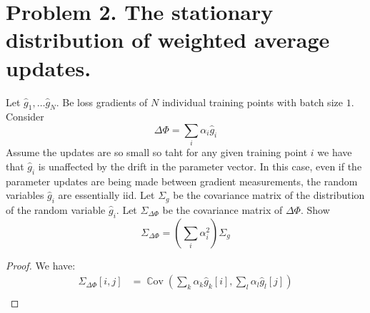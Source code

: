 \documentclass{amsart}
\newcommand{\Cov}[1]{\operatorname{\mathbb{C}ov}\left(#1\right)}
\theoremstyle{definition}
\begin{document}
\section*{Problem 2. The stationary distribution of weighted average updates. }
Let $\hat{g}_1, \ldots \hat{g}_N$. Be loss gradients of $N$ individual training points with batch size $1$. 
Consider 
\[
\Delta \Phi = \sum_{i} \alpha_i \hat{g}_i
\]
Assume the updates are so small so taht for any given training point $i$ we have that $\hat{g}_i$ is unaffected by the drift in the parameter vector.
In this case, even if the parameter updates are being made between gradient measurements, the random variables $\hat{g}_i$ are essentially iid. 
Let $\Sigma_g$ be the covariance matrix of the distribution of the random variable $\hat{g}_i$. 
Let $\Sigma_{\Delta \Phi}$ be the covariance matrix of $\Delta \Phi$. 
Show
\[
\Sigma_{\Delta\Phi} = \left(
\sum_{i} \alpha_i^2
\right) \Sigma_g
\]
\begin{proof}
  We have:
  \begin{align*}
    \Sigma_{\Delta\Phi}[i,j] &= \Cov{\sum_{k} \alpha_k \hat{g}_k[i], \sum_{l} \alpha_l \hat{g}_l[j]} \\
  \end{align*}
\end{proof}
\end{document}
